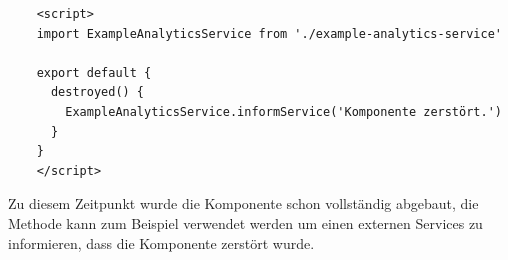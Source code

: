 \begin{lstlisting}
    <script>
    import ExampleAnalyticsService from './example-analytics-service'
    
    export default {
      destroyed() {
        ExampleAnalyticsService.informService('Komponente zerstört.')
      }
    }
    </script>
\end{lstlisting}

Zu diesem Zeitpunkt wurde die Komponente schon vollständig abgebaut,  die Methode kann zum Beispiel verwendet werden um einen externen Services zu informieren, dass die Komponente zerstört wurde.

\cite{frontend_web_vuejs_lifecycle}

\newpage
